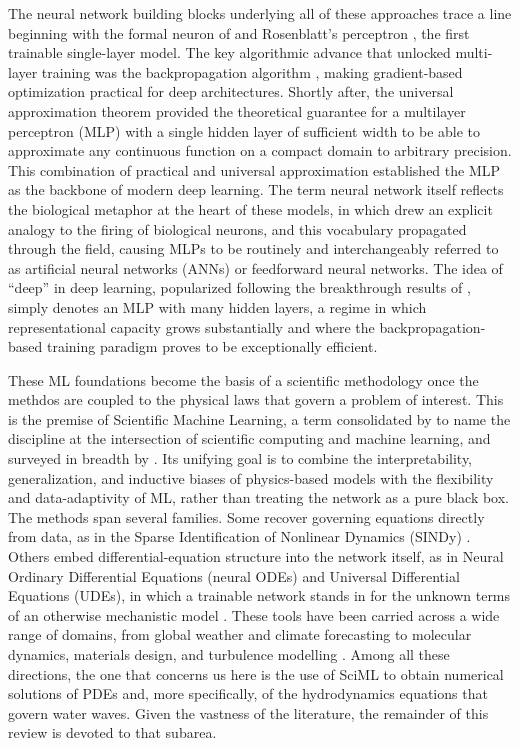 The neural network building blocks underlying all of these approaches trace a line beginning with the formal neuron of \textcite{mcculloch1943} and Rosenblatt's perceptron \parencite{rosenblatt1958}, the first trainable single-layer model. The key algorithmic advance that unlocked multi-layer training was the backpropagation algorithm \parencite{rumelhart1986}, making gradient-based optimization practical for deep architectures. Shortly after, the universal approximation theorem \parencite{cybenko1989, hornik1989} provided the theoretical guarantee for a multilayer perceptron (MLP) with a single hidden layer of sufficient width to be able to approximate any continuous function on a compact domain to arbitrary precision. This combination of practical and universal approximation established the MLP as the backbone of modern deep learning. The term neural network itself reflects the biological metaphor at the heart of these models, in which \textcite{mcculloch1943} drew an explicit analogy to the firing of biological neurons, and this vocabulary propagated through the field, causing MLPs to be routinely and interchangeably referred to as artificial neural networks (ANNs) or feedforward neural networks. The idea of ``deep'' in deep learning, popularized following the breakthrough results of \textcite{lecun2015deep}, simply denotes an MLP with many hidden layers, a regime in which representational capacity grows substantially and where the backpropagation-based training paradigm proves to be exceptionally efficient.

These ML foundations become the basis of a scientific methodology once the methdos are coupled to the physical laws that govern a problem of interest. This is the premise of Scientific Machine Learning, a term consolidated by \textcite{baker2019} to name the discipline at the intersection of scientific computing and machine learning, and surveyed in breadth by \textcite{karniadakis2021}. Its unifying goal is to combine the interpretability, generalization, and inductive biases of physics-based models with the flexibility and data-adaptivity of ML, rather than treating the network as a pure black box. The methods span several families. Some recover governing equations directly from data, as in the Sparse Identification of Nonlinear Dynamics (SINDy) \parencite{brunton2016}. Others embed differential-equation structure into the network itself, as in Neural Ordinary Differential Equations (neural ODEs) \parencite{chen2018node} and Universal Differential Equations (UDEs), in which a trainable network stands in for the unknown terms of an otherwise mechanistic model \parencite{rackauckas2020}. These tools have been carried across a wide range of domains, from global weather and climate forecasting \parencite{bonev2023} to molecular dynamics, materials design, and turbulence modelling \parencite{karniadakis2021}. Among all these directions, the one that concerns us here is the use of SciML to obtain numerical solutions of PDEs and, more specifically, of the hydrodynamics equations that govern water waves. Given the vastness of the literature, the remainder of this review is devoted to that subarea.

